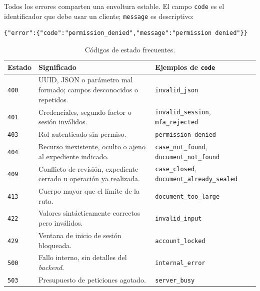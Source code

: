 Todos los errores comparten una envoltura estable. El campo \texttt{code} es
el identificador que debe usar un cliente; \texttt{message} es descriptivo:

\begin{verbatim}
{"error":{"code":"permission_denied","message":"permission denied"}}
\end{verbatim}

\begin{table}[H]
  \centering
  \caption{Códigos de estado frecuentes.}\label{tab:api-estados}
  \begin{tabularx}{\textwidth}{L{1.4cm} Y L{5.2cm}}
    \toprule
    \textbf{Estado} & \textbf{Significado} & \textbf{Ejemplos de \texttt{code}} \\
    \midrule
    \texttt{400} & UUID, JSON o parámetro mal formado; campos desconocidos o
                   repetidos. & \texttt{invalid\_json} \\
    \texttt{401} & Credenciales, segundo factor o sesión inválidos.
                 & \texttt{invalid\_session}, \texttt{mfa\_rejected} \\
    \texttt{403} & Rol autenticado sin permiso.
                 & \texttt{permission\_denied} \\
    \texttt{404} & Recurso inexistente, oculto o ajeno al expediente
                   indicado.
                 & \texttt{case\_not\_found}, \texttt{document\_not\_found} \\
    \texttt{409} & Conflicto de revisión, expediente cerrado u operación ya
                   realizada.
                 & \texttt{case\_closed}, \texttt{document\_already\_sealed} \\
    \texttt{413} & Cuerpo mayor que el límite de la ruta.
                 & \texttt{document\_too\_large} \\
    \texttt{422} & Valores sintácticamente correctos pero inválidos.
                 & \texttt{invalid\_input} \\
    \texttt{429} & Ventana de inicio de sesión bloqueada.
                 & \texttt{account\_locked} \\
    \texttt{500} & Fallo interno, sin detalles del \emph{backend}.
                 & \texttt{internal\_error} \\
    \texttt{503} & Presupuesto de peticiones agotado.
                 & \texttt{server\_busy} \\
    \bottomrule
  \end{tabularx}
\end{table}

